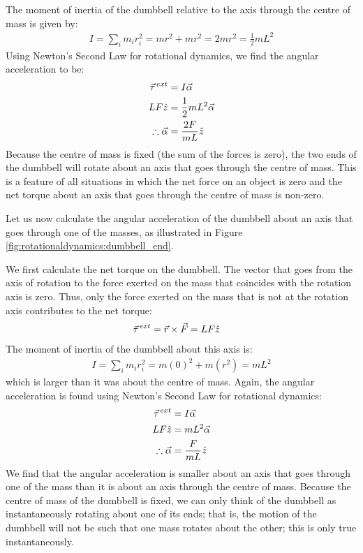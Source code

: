 \begin{example}
The moment of inertia of the dumbbell relative to the axis through the centre of mass is given by:
\begin{align*}
I = \sum_i  m_ir_i^2 = mr^2 +mr^2 = 2mr^2 = \frac{1}{2}mL^2
\end{align*}
Using Newton's Second Law for rotational dynamics, we find the angular acceleration to be:
\begin{align*}
\pvec\tau^{ext}&= I\vec\alpha\\
LF\hat z&=\frac{1}{2}mL^2\vec\alpha\\
\therefore \vec\alpha &= \frac{2F}{mL}\hat z
\end{align*}
Because the centre of mass is fixed (the sum of the forces is zero), the two ends of the dumbbell will rotate about an axis that goes through the centre of mass. This is a feature of all situations in which the net force on an object is zero and the net torque about an axis that goes through the centre of mass is non-zero.

Let us now calculate the angular acceleration of the dumbbell about an axis that goes through one of the masses, as illustrated in Figure \ref{fig:rotationaldynamics:dumbbell_end}.

We first calculate the net torque on the dumbbell. The vector that goes from the axis of rotation to the force exerted on the mass that coincides with the rotation axis is zero. Thus, only the force exerted on the mass that is not at the rotation axis contributes to the net torque:
\begin{align*}
\pvec\tau^{ext}&= \vec r \times \vec F = LF\hat z
\end{align*}
The moment of inertia of the dumbbell about this axis is:
\begin{align*}
I = \sum_i  m_ir_i^2 = m(0)^2 + m(r^2) = mL^2
\end{align*}
which is larger than it was about the centre of mass. Again, the angular acceleration is found using Newton's Second Law for rotational dynamics:
\begin{align*}
\pvec\tau^{ext}&= I\vec\alpha\\
LF\hat z&=mL^2\vec\alpha\\
\therefore \vec\alpha &= \frac{F}{mL}\hat z
\end{align*}
We find that the angular acceleration is smaller about an axis that goes through one of the mass than it is about an axis through the centre of mass. Because the centre of mass of the dumbbell is fixed, we can only think of the dumbbell as instantaneously rotating about one of its ends; that is, the motion of the dumbbell will not be such that one mass rotates about the other; this is only true instantaneously.


\end{example}
